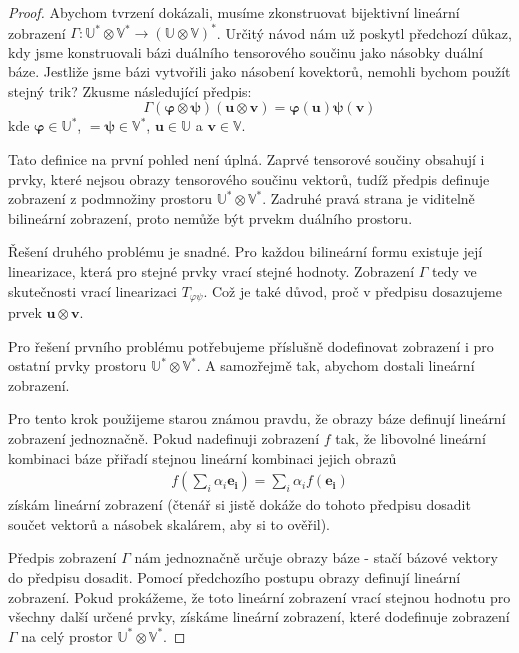 \documentclass[a5paper,12pt]{amsbook}
\theoremstyle{definition}
\newcommand{\myvec}[1]{\mathbf{#1}}
\newcommand{\myspace}[1]{\mathbb{#1}}
\begin{document}
\begin{proof}
Abychom tvrzení dokázali, musíme zkonstruovat bijektivní lineární zobrazení
$\Gamma: \myspace{U^*}\otimes\myspace{V^*}\rightarrow(\myspace{U}\otimes\myspace{V})^*$. Určitý
návod nám už poskytl předchozí důkaz, kdy jsme konstruovali bázi duálního tensorového součinu
jako násobky duální báze. Jestliže jsme bázi vytvořili jako násobení kovektorů, nemohli bychom
použít stejný trik? Zkusme následující předpis:
\begin{equation*}
\Gamma(\myvec{\varphi}\otimes\myvec{\psi})(\myvec{u}\otimes\myvec{v}) 
  = \myvec{\varphi}(\myvec{u})\myvec{\psi}(\myvec{v})
\end{equation*}
kde $\myvec{\varphi}\in\myspace{U^*}$, $=\myvec{\psi}\in\myspace{V^*}$, $\myvec{u}\in\myspace{U}$
a $\myvec{v}\in\myspace{V}$.

Tato definice na první pohled není úplná. Zaprvé tensorové součiny obsahují i prvky,
které nejsou obrazy tensorového součinu vektorů, tudíž předpis definuje zobrazení z podmnožiny
prostoru $\myspace{U^*}\otimes\myspace{V^*}$. Zadruhé pravá strana je viditelně bilineární
zobrazení, proto nemůže být prvekm duálního prostoru.

Řešení druhého problému je snadné. Pro každou bilineární formu existuje její linearizace,
která pro stejné prvky vrací stejné hodnoty. Zobrazení $\Gamma$ tedy ve skutečnosti vrací
linearizaci $T_{\varphi\psi}$. Což je také důvod, proč v předpisu dosazujeme prvek
$\myvec{u}\otimes\myvec{v}$.

Pro řešení prvního problému potřebujeme příslušně dodefinovat zobrazení i pro ostatní prvky
prostoru $\myspace{U^*}\otimes\myspace{V^*}$. A samozřejmě tak, abychom dostali lineární
zobrazení.

Pro tento krok použijeme starou známou pravdu, že obrazy báze definují lineární zobrazení
jednoznačně. Pokud nadefinuji zobrazení $f$ tak, že libovolné lineární kombinaci báze
přiřadí stejnou lineární kombinaci jejich obrazů
\begin{equation*}
\begin{split}
f(\sum_i\alpha_i\myvec{e_i}) = \sum_i\alpha_i f(\myvec{e_i})
\end{split}
\end{equation*}
získám lineární zobrazení (čtenář si jistě dokáže do tohoto předpisu dosadit součet vektorů
a násobek skalárem, aby si to ověřil).

Předpis zobrazení $\Gamma$ nám jednoznačně určuje obrazy báze - stačí bázové vektory do předpisu
dosadit. Pomocí předchozího postupu obrazy definují lineární zobrazení. Pokud prokážeme, že
toto lineární zobrazení vrací stejnou hodnotu pro všechny další určené prvky, získáme lineární
zobrazení, které dodefinuje zobrazení $\Gamma$ na celý prostor $\myspace{U^*}\otimes\myspace{V^*}$.


\end{proof}
\end{document}
